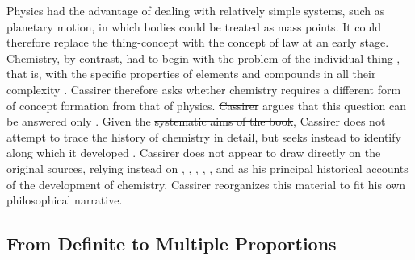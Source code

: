 \documentclass[submitted,12pt]{article}
\providecommand{\DIFadd}[1]{{\protect\color{blue}\uwave{#1}}} %
\providecommand{\DIFdel}[1]{{\protect\color{red}\sout{#1}}}                      %
\providecommand{\DIFaddbegin}{} %
\providecommand{\DIFaddend}{} %
\providecommand{\DIFdelbegin}{} %
\providecommand{\DIFdelend}{} %
\begin{document}
Physics had the advantage of dealing with relatively simple systems, such as planetary motion, in which bodies could be treated as  mass points. It could therefore replace the thing-concept  with the concept of law  at an early stage. Chemistry, by contrast, had to begin with the problem of the individual thing , that is, with the specific properties of elements and compounds in all their complexity . Cassirer therefore asks whether chemistry requires a different form of concept formation from that of physics. \DIFdelbegin \DIFdel{Cassirer }\DIFdelend \DIFaddbegin \DIFadd{He }\DIFaddend argues that this question can be answered only  . Given the \DIFdelbegin \DIFdel{systematic aims of the book}\DIFdelend \DIFaddbegin \DIFadd{book's systematic aims}\DIFaddend , Cassirer does not attempt to trace the history of chemistry in detail, but seeks instead to identify  along which it developed .  Cassirer does not appear to draw directly on the original sources, relying instead on \citet{Wurtz1879}, \citet{Meyer1884}, \citet{Berthelot1885}, \citet{Ladenburg1902}, \citet{Duhem1902}, and \citet{Ostwald1906Leitlinien} as his principal historical accounts of the development of chemistry. Cassirer reorganizes this material to fit his own philosophical narrative. 

\subsection{From Definite to Multiple Proportions}
\end{document}
